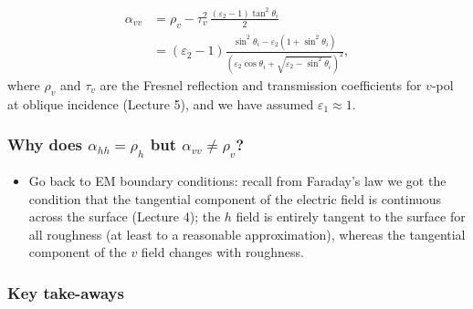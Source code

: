 \documentclass[11pt, oneside]{article}
\begin{document}
\begin{itemize}
	\begin{align}
		\alpha_{vv} &= \rho_v - \tau_v^2\,\frac{\left(\varepsilon_2 - 1\right)\tan^2\theta_i}{2} \label{e:avv}\\
		&= \left(\varepsilon_2 - 1\right)\frac{\sin^2\theta_i - \varepsilon_2\left(1 + \sin^2\theta_i\right)}{\left(\varepsilon_2\cos\theta_i + \sqrt{\varepsilon_2 - \sin^2\theta_i}\right)^2}, \nonumber
	\end{align}
	where $\rho_v$ and $\tau_v$ are the Fresnel reflection and transmission coefficients for $v$-pol at oblique incidence (Lecture 5), and we have assumed $\varepsilon_1 \approx 1$.
\end{itemize}

\subsubsection{Why does $\alpha_{hh} = \rho_h$ but $\alpha_{vv} \ne \rho_v$?}

\begin{itemize}
	\item[A.] Go back to EM boundary conditions: recall from Faraday's law we got the condition that the tangential component of the electric field is continuous across the surface (Lecture 4); the $h$ field is entirely tangent to the surface for all roughness (at least to a reasonable approximation), whereas the tangential component of the $v$ field changes with roughness.
\end{itemize}

\subsubsection{Key take-aways}
\end{document}
